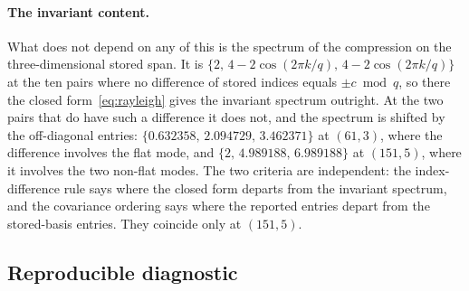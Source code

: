 \documentclass[11pt,a4paper]{article}
\begin{document}
    \paragraph{The invariant content.}
      What does not depend on any of this is the spectrum of the compression on the
      three-dimensional stored span.
      It is $\{2,\, 4 - 2\cos(2\pi k/q),\, 4 - 2\cos(2\pi k/q)\}$ at the ten pairs where no
      difference of stored indices equals $\pm c \bmod q$, so there the closed
      form~\eqref{eq:rayleigh} gives the invariant spectrum outright.
      At the two pairs that do have such a difference it does not, and the spectrum is shifted by
      the off-diagonal entries: $\{0.632358,\, 2.094729,\, 3.462371\}$ at $(61,3)$, where the
      difference involves the flat mode, and $\{2,\, 4.989188,\, 6.989188\}$ at $(151,5)$, where it
      involves the two non-flat modes.
      The two criteria are independent: the index-difference rule says where the closed form
      departs from the invariant spectrum, and the covariance ordering says where the reported
      entries depart from the stored-basis entries. They coincide only at $(151,5)$.

  \subsection{Reproducible diagnostic}
    \label{ssec:diagnostic}
\end{document}
